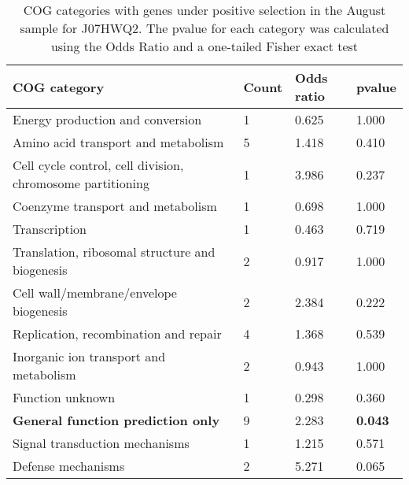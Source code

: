 \begin{table}[hb]
\footnotesize 
	\tabcolsep=0.11cm 
\caption{COG categories with genes under positive selection in the August sample for J07HWQ2. The pvalue for each category was calculated using the Odds Ratio and a one-tailed Fisher exact test \\} 
\begin{tabularx}{\textwidth}{L{6cm}R{2cm}R{2cm}R{2cm}} 
\hline 
\textbf{COG category} & \textbf{Count} & \textbf{Odds ratio} & \textbf{pvalue} \\ 
\hline 
Energy production and conversion & 1 & 0.625 & 1.000 \\ 
Amino acid transport and metabolism & 5 & 1.418 & 0.410 \\ 
Cell cycle control, cell division, chromosome partitioning & 1 & 3.986 & 0.237 \\ 
Coenzyme transport and metabolism & 1 & 0.698 & 1.000 \\ 
Transcription & 1 & 0.463 & 0.719 \\ 
Translation, ribosomal structure and biogenesis & 2 & 0.917 & 1.000 \\ 
Cell wall/membrane/envelope biogenesis & 2 & 2.384 & 0.222 \\ 
Replication, recombination and repair & 4 & 1.368 & 0.539 \\ 
Inorganic ion transport and metabolism & 2 & 0.943 & 1.000 \\ 
Function unknown & 1 & 0.298 & 0.360 \\ 
\textbf{General function prediction only} & 9 & 2.283 & \textbf{0.043} \\ 
Signal transduction mechanisms & 1 & 1.215 & 0.571 \\ 
Defense mechanisms & 2 & 5.271 & 0.065 \\ 
\end{tabularx} 
\label{August_COG_Selection_J07HWQ2} 
 \end{table} 

